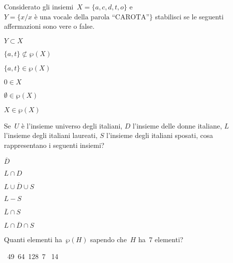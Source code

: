 \begin{esercizio}
\label{ese:7.71}
Considerato gli insiemi~\(X=\{a,c,d,t,o\}\) e 
\(Y=\{x/x\text{ è una vocale della parola ``CAROTA''}\}\)
stabilisci se le seguenti affermazioni sono vere o false.

\TabPositions{8cm}
\begin{multicols}{3}
\begin{enumeratea}
\item \(Y \subset X\) \hfill \boxV\quad\boxF
\item \(\{a,t\}\not\subset \wp (X)\) \hfill \boxV\quad\boxF
\item \(\{a,t\}\in \wp (X)\) \hfill \boxV\quad\boxF
\item \(0\in X\) \hfill \boxV\quad\boxF
\item \(\emptyset \in \wp (X)\) \hfill \boxV\quad\boxF
\item \(X\in \wp (X)\) \hfill \boxV\quad\boxF
\end{enumeratea}
\end{multicols}
\end{esercizio}

\begin{esercizio}
\label{ese:7.72}
Se~\(U\) è l'insieme universo degli italiani, \(D\) l'insieme delle donne 
italiane,
\(L\) l'insieme degli italiani laureati, \(S\) l'insieme degli italiani 
sposati, 
cosa rappresentano
i seguenti insiemi?
\begin{multicols}{3}
\begin{enumeratea}
\item \(\overline{D}\)
\item \(L\cap D\)
\item \(\overline{{L\cup D\cup S}}\)
\item \(L-S\)
\item \(\overline{{L}}\cap S\)
\item \(\overline{{L\cap D\cap S}}\)
\end{enumeratea}
\end{multicols}
\end{esercizio}

\begin{esercizio}
\label{ese:7.73}
Quanti elementi ha~\(\wp (H)\) sapendo che~\(H\) ha~7 elementi?
\begin{center}
 
\boxA\quad~49\quad\boxB\quad~64\quad\boxC\quad~128\quad\boxD\quad~7\quad
\boxE\quad~14
\end{center}
\end{esercizio}

